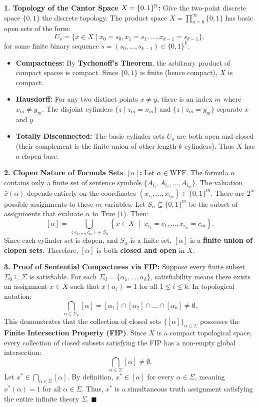 \begin{solution}
\textbf{1. Topology of the Cantor Space $X = \{0, 1\}^{\mathbb{N}}$:}
Give the two-point discrete space $\{0, 1\}$ the discrete topology. The product space $X = \prod_{n=0}^\infty \{0, 1\}$ has basic open sets of the form:
\[
U_{s} = \{ x \in X \mid x_0 = s_0, x_1 = s_1, \dots, x_{k-1} = s_{k-1} \},
\]
for some finite binary sequence $s = (s_0, \dots, s_{k-1}) \in \{0, 1\}^k$.
\begin{itemize}[leftmargin=1.4em,itemsep=2pt]
  \item \textbf{Compactness:} By \textbf{Tychonoff's Theorem}, the arbitrary product of compact spaces is compact. Since $\{0, 1\}$ is finite (hence compact), $X$ is compact.
  \item \textbf{Hausdorff:} For any two distinct points $x \ne y$, there is an index $m$ where $x_m \ne y_m$. The disjoint cylinders $\{z \mid z_m = x_m\}$ and $\{z \mid z_m = y_m\}$ separate $x$ and $y$.
  \item \textbf{Totally Disconnected:} The basic cylinder sets $U_s$ are both open and closed (their complement is the finite union of other length-$k$ cylinders). Thus $X$ has a clopen base.
\end{itemize}

\textbf{2. Clopen Nature of Formula Sets $[\alpha]$:}
Let $\alpha \in \mathrm{WFF}$. The formula $\alpha$ contains only a finite set of sentence symbols $\{A_{i_1}, A_{i_2}, \dots, A_{i_m}\}$.
The valuation $\bar{x}(\alpha)$ depends entirely on the coordinates $(x_{i_1}, \dots, x_{i_m}) \in \{0, 1\}^m$.
There are $2^m$ possible assignments to these $m$ variables.
Let $S_\alpha \subseteq \{0, 1\}^m$ be the subset of assignments that evaluate $\alpha$ to True ($1$).
Then:
\[
[\alpha] = \bigcup_{(c_1, \dots, c_m) \in S_\alpha} \left\{ x \in X \;\middle|\; x_{i_1} = c_1, \dots, x_{i_m} = c_m \right\}.
\]
Since each cylinder set is clopen, and $S_\alpha$ is a finite set, $[\alpha]$ is a \textbf{finite union of clopen sets}.
Therefore, $[\alpha]$ is both \textbf{closed and open} in $X$.

\textbf{3. Proof of Sentential Compactness via FIP:}
Suppose every finite subset $\Sigma_0 \subseteq \Sigma$ is satisfiable.
For each $\Sigma_0 = \{\alpha_1, \dots, \alpha_k\}$, satisfiability means there exists an assignment $x \in X$ such that $\bar{x}(\alpha_i) = 1$ for all $1 \le i \le k$.
In topological notation:
\[
\bigcap_{\alpha \in \Sigma_0} [\alpha] = [\alpha_1] \cap [\alpha_2] \cap \dots \cap [\alpha_k] \ne \emptyset.
\]
This demonstrates that the collection of closed sets $\{ [\alpha] \}_{\alpha \in \Sigma}$ possesses the \textbf{Finite Intersection Property (FIP)}.
Since $X$ is a compact topological space, every collection of closed subsets satisfying the FIP has a non-empty global intersection:
\[
\bigcap_{\alpha \in \Sigma} [\alpha] \ne \emptyset.
\]
Let $x^* \in \bigcap_{\alpha \in \Sigma} [\alpha]$.
By definition, $x^* \in [\alpha]$ for every $\alpha \in \Sigma$, meaning $\overline{x^*}(\alpha) = 1$ for all $\alpha \in \Sigma$.
Thus, $x^*$ is a simultaneous truth assignment satisfying the entire infinite theory $\Sigma$. \hfill $\blacksquare$
\end{solution}

